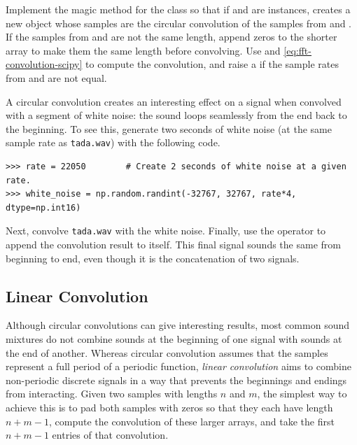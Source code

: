 \begin{problem} %
\item Implement the  magic method for the  class so that if  and  are  instances,  creates a new  object whose samples are the circular convolution of the samples from  and .
If the samples from  and  are not the same length, append zeros to the shorter array to make them the same length before convolving.
Use  and \eqref{eq:fft-convolution-scipy} to compute the convolution, and raise a  if the sample rates from  and  are not equal.

A circular convolution creates an interesting effect on a signal when convolved with a segment of white noise: the sound loops seamlessly from the end back to the beginning.
To see this, generate two seconds of white noise (at the same sample rate as \texttt{tada.wav}) with the following code.
\begin{lstlisting}
>>> rate = 22050        # Create 2 seconds of white noise at a given rate.
>>> white_noise = np.random.randint(-32767, 32767, rate*4, dtype=np.int16)
\end{lstlisting}
Next, convolve \texttt{tada.wav} with the white noise.
Finally, use the \li{>>} operator to append the convolution result to itself.
This final signal sounds the same from beginning to end, even though it is the concatenation of two signals.
\end{problem}

\subsection*{Linear Convolution} %

Although circular convolutions can give interesting results, most common sound mixtures do not combine sounds at the beginning of one signal with sounds at the end of another.
Whereas circular convolution assumes that the samples represent a full period of a periodic function, \emph{linear convolution} aims to combine non-periodic discrete signals in a way that prevents the beginnings and endings from interacting.
Given two samples with lengths $n$ and $m$, the simplest way to achieve this is to pad both samples with zeros so that they each have length $n+m-1$, compute the convolution of these larger arrays, and take the first $n+m-1$ entries of that convolution.

